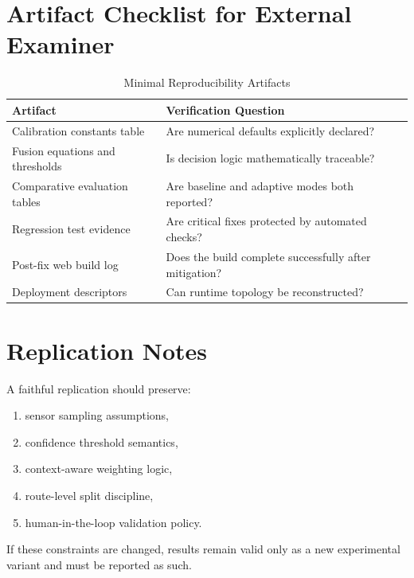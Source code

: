 \section{Artifact Checklist for External Examiner}
\begin{table}[ht]
\centering
\caption{Minimal Reproducibility Artifacts}
{\small
\begin{tabular}{@{}L{4.0cm}L{6.2cm}@{}}
\toprule
\textbf{Artifact} & \textbf{Verification Question} \\ \midrule
Calibration constants table & Are numerical defaults explicitly declared? \\
Fusion equations and thresholds & Is decision logic mathematically traceable? \\
Comparative evaluation tables & Are baseline and adaptive modes both reported? \\
Regression test evidence & Are critical fixes protected by automated checks? \\
Post-fix web build log & Does the build complete successfully after mitigation? \\
Deployment descriptors & Can runtime topology be reconstructed? \\
\bottomrule
\end{tabular}
}
\end{table}

\section{Replication Notes}
A faithful replication should preserve:
\begin{enumerate}
    \item sensor sampling assumptions,
    \item confidence threshold semantics,
    \item context-aware weighting logic,
    \item route-level split discipline,
    \item human-in-the-loop validation policy.
\end{enumerate}

If these constraints are changed, results remain valid only as a new experimental variant and must be reported as such.
